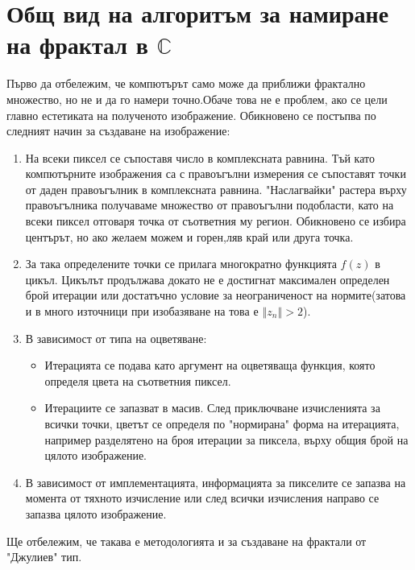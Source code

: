 \section{Общ вид на алгоритъм за намиране на фрактал в $\mathbb{C}$}
\begin{Large}
Първо да отбележим, че компютърът само може да приближи фрактално множество, но не и да го намери точно.Обаче това не е проблем, ако се цели главно естетиката на полученото изображение. Обикновено се постъпва по следният начин за създаване на изображение:
\begin{enumerate}
\item На всеки пиксел се съпоставя число в комплексната равнина. Тъй като компютърните изображения са с правоъгълни измерения се съпоставят точки от даден правоъгълник в комплексната равнина. "Наслагвайки" растера върху правоъгълника получаваме множество от правоъгълни подобласти, като на всеки пиксел отговаря точка от съответния му регион. Обикновено се избира центърът, но ако желаем можем и горен,ляв край или друга точка.

\hspace{3cm}


\item За така определените точки се прилага многократно функцията $f(z)$ в цикъл. Цикълът продължава докато не е достигнат максимален определен брой итерации или достатъчно условие за неограниченост на нормите(затова и в много източници при изобазяване на  това е $\left\Vert z_n \right\Vert > 2$).
\item В зависимост от типа на оцветяване:
\begin{itemize}
\item Итерацията се подава като аргумент на оцветяваща функция, която определя цвета на съответния пиксел.
\item Итерациите се запазват в масив. След приключване изчисленията за всички точки, цветът се определя по "нормирана" форма на итерацията, например разделятено на броя итерации за пиксела, върху общия брой на цялото изображение.
\end{itemize}
\item В зависимост от имплементацията, информацията за пикселите се запазва на момента от тяхното изчисление или след всички изчисления направо се запазва цялото изображение. 


\end{enumerate}

Ще отбележим, че такава е методологията и за създаване на фрактали от "Джулиев" тип.


\end{Large}